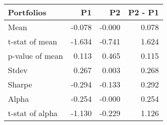 \begin{tabular}{lrrr}
\toprule
Portfolios & P1 & P2 & P2 - P1 \\
\midrule
Mean & -0.078 & -0.000 & 0.078 \\
t-stat of mean & -1.634 & -0.741 & 1.624 \\
p-value of mean & 0.113 & 0.465 & 0.115 \\
Stdev & 0.267 & 0.003 & 0.268 \\
Sharpe & -0.294 & -0.133 & 0.292 \\
Alpha & -0.254 & -0.000 & 0.254 \\
t-stat of alpha & -1.130 & -0.229 & 1.126 \\
\bottomrule
\end{tabular}
